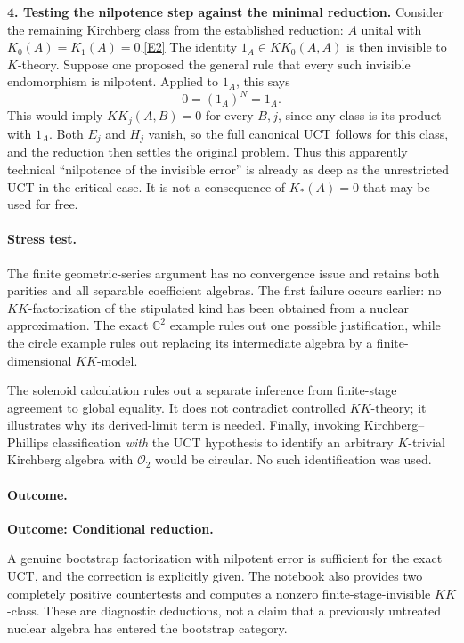 \documentclass[11pt,a4paper]{article}
\newcommand{\C}{\mathbb{C}}
\newcommand{\eref}[2]{\hyperlink{extra:#1:#2}{[E#2]}}
\begin{document}
\textbf{4. Testing the nilpotence step against the minimal reduction.}
Consider the remaining Kirchberg class from the established reduction:
$A$ unital with $K_0(A)=K_1(A)=0$.\eref{statement}{2}
The identity $1_A\in KK_0(A,A)$ is then invisible to $K$-theory. Suppose
one proposed the general rule that every such invisible endomorphism is
nilpotent. Applied to $1_A$, this says
\[
 0=(1_A)^N=1_A.
\]
This would imply $KK_j(A,B)=0$ for every $B,j$, since any class is its
product with $1_A$. Both $E_j$ and $H_j$ vanish, so the full canonical
UCT follows for this class, and the reduction then settles the original
problem. Thus this apparently technical ``nilpotence of the invisible
error'' is already as deep as the unrestricted UCT in the critical case.
It is not a consequence of $K_*(A)=0$ that may be used for free.

\paragraph{Stress test.}
The finite geometric-series argument has no convergence issue and retains
both parities and all separable coefficient algebras. The first failure
occurs earlier: no $KK$-factorization of the stipulated kind has been
obtained from a nuclear approximation. The exact $\C^2$ example rules out
one possible justification, while the circle example rules out replacing
its intermediate algebra by a finite-dimensional $KK$-model.

The solenoid calculation rules out a separate inference from finite-stage
agreement to global equality. It does not contradict controlled
$KK$-theory; it illustrates why its derived-limit term is needed.
Finally, invoking Kirchberg--Phillips classification \emph{with} the UCT
hypothesis to identify an arbitrary $K$-trivial Kirchberg algebra with
$\mathcal O_2$ would be circular. No such identification was used.

\paragraph{Outcome.}
\textbf{Outcome: Conditional reduction.}

A genuine bootstrap factorization with nilpotent error is sufficient for
the exact UCT, and the correction is explicitly given. The notebook also
provides two completely positive countertests and computes a nonzero
finite-stage-invisible $KK$-class. These are diagnostic deductions, not a
claim that a previously untreated nuclear algebra has entered the
bootstrap category.
\end{document}
